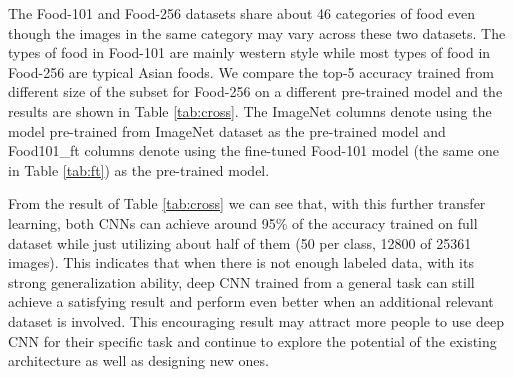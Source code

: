 The Food-101 and Food-256 datasets share about 46 categories of food even though the images in the same category may vary across these two datasets. The types of food in Food-101 are mainly western style while most types of food in Food-256 are typical Asian foods. We compare the top-5 accuracy trained from different size of the subset for Food-256 on a different pre-trained model and the results are shown in Table \ref{tab:cross}.
The ImageNet columns denote using the model pre-trained from ImageNet dataset as the pre-trained model and Food101\_ft columns denote using the fine-tuned Food-101 model (the same one in Table \ref{tab:ft}) as the pre-trained model.

From the result of Table \ref{tab:cross} we can see that, with this further transfer learning, both CNNs can achieve around 95\% of the accuracy trained on full dataset while just utilizing about half of them (50 per class, 12800 of 25361 images). This indicates that when there is not enough labeled data, with its strong generalization ability, deep CNN trained from a general task can still achieve a satisfying result and perform even better when an additional relevant dataset is involved. This encouraging result may attract more people to use deep CNN for their specific task and continue to explore the potential of the existing architecture as well as designing new ones.


